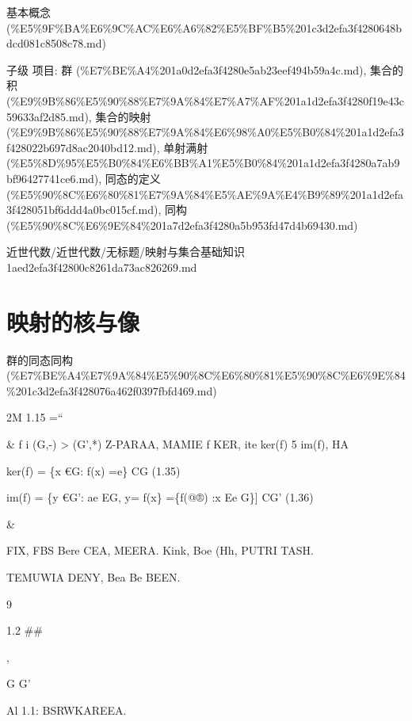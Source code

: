 \begin{note}[来源上级主题]

基本概念 (\%E5\%9F\%BA\%E6\%9C\%AC\%E6\%A6\%82\%E5\%BF\%B5\%201c3d2efa3f4280648bdcd081c8508c78.md)

\end{note}

\begin{note}[映射与集合基础知识]

子级 项目: 群 (\%E7\%BE\%A4\%201a0d2efa3f4280e5ab23eef494b59a4c.md), 集合的积 (\%E9\%9B\%86\%E5\%90\%88\%E7\%9A\%84\%E7\%A7\%AF\%201a1d2efa3f4280f19e43c59633af2d85.md), 集合的映射 (\%E9\%9B\%86\%E5\%90\%88\%E7\%9A\%84\%E6\%98\%A0\%E5\%B0\%84\%201a1d2efa3f428022b697d8ac2040bd12.md), 单射满射 (\%E5\%8D\%95\%E5\%B0\%84\%E6\%BB\%A1\%E5\%B0\%84\%201a1d2efa3f4280a7ab9bf96427741ce6.md), 同态的定义 (\%E5\%90\%8C\%E6\%80\%81\%E7\%9A\%84\%E5\%AE\%9A\%E4\%B9\%89\%201a1d2efa3f428051bf6ddd4a0bc015cf.md), 同构 (\%E5\%90\%8C\%E6\%9E\%84\%201a7d2efa3f4280a5b953fd47d4b69430.md)

\end{note}

\begin{note}[来源路径]

近世代数/近世代数/无标题/映射与集合基础知识 1aed2efa3f42800c8261da73ac826269.md

\end{note}

\section*{映射的核与像}

\begin{note}[来源上级主题]

群的同态同构 (\%E7\%BE\%A4\%E7\%9A\%84\%E5\%90\%8C\%E6\%80\%81\%E5\%90\%8C\%E6\%9E\%84\%201c3d2efa3f428076a462f0397fbfd469.md)

\end{note}

\begin{note}[映射的核与像]

2M 1.15                                                    =“

\& f i (G,-) > (G’,*) Z-PARAA, MAMIE f KER, ite ker(f) 5 im(f), HA

ker(f) = \{x €G: f(x) =e\} CG                      (1.35)

im(f) = \{y €G’: ae EG, y= f(x\} =\{f(@®) :x Ee G\}] CG’                    (1.36)

\&

FIX, FBS Bere CEA, MEERA. Kink, Boe (Hh, PUTRI TASH.

TEMUWIA DENY, Bea Be BEEN.

9

1.2 \#\#

,

G                                                G’

Al 1.1: BSRWKAREEA.

\end{note}

